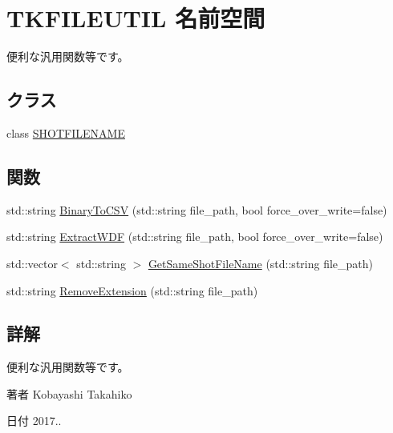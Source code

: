 \hypertarget{namespace_t_k_f_i_l_e_u_t_i_l}{}\section{T\+K\+F\+I\+L\+E\+U\+T\+IL 名前空間}
\label{namespace_t_k_f_i_l_e_u_t_i_l}


便利な汎用関数等です。  


\subsection*{クラス}
\begin{DoxyCompactItemize}
\item 
class \hyperlink{class_t_k_f_i_l_e_u_t_i_l_1_1_s_h_o_t_f_i_l_e_n_a_m_e}{S\+H\+O\+T\+F\+I\+L\+E\+N\+A\+ME}
\end{DoxyCompactItemize}
\subsection*{関数}
\begin{DoxyCompactItemize}
\item 
std\+::string \hyperlink{namespace_t_k_f_i_l_e_u_t_i_l_afb1f2be7ac9b585fc688a2c9a0e50094}{Binary\+To\+C\+SV} (std\+::string file\+\_\+path, bool force\+\_\+over\+\_\+write=false)
\item 
std\+::string \hyperlink{namespace_t_k_f_i_l_e_u_t_i_l_a021f69b1dbf05a9501e30326b836c2a9}{Extract\+W\+DF} (std\+::string file\+\_\+path, bool force\+\_\+over\+\_\+write=false)
\item 
std\+::vector$<$ std\+::string $>$ \hyperlink{namespace_t_k_f_i_l_e_u_t_i_l_a378ed1b7bfa3028b922a122f72f38b28}{Get\+Same\+Shot\+File\+Name} (std\+::string file\+\_\+path)
\item 
std\+::string \hyperlink{namespace_t_k_f_i_l_e_u_t_i_l_ae7b4e47d9221322ea5dbaaaefd83b2b6}{Remove\+Extension} (std\+::string file\+\_\+path)
\end{DoxyCompactItemize}


\subsection{詳解}
便利な汎用関数等です。 

\begin{DoxyAuthor}{著者}
Kobayashi Takahiko 
\end{DoxyAuthor}
\begin{DoxyDate}{日付}
2017.. 
\end{DoxyDate}


